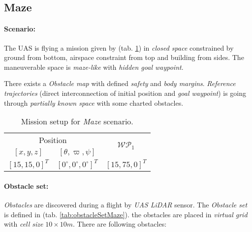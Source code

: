 \subsection{Maze}\label{s:testMaze}

\paragraph{Scenario:} The UAS is flying a mission given by (tab. \ref{tab:missionSetupMazeScenario}) in \emph{closed space} constrained by ground from bottom, airspace constraint from top and building from sides. The maneuverable space is \emph{maze-like} with  \emph{hidden goal waypoint}.

There exists a \emph{Obstacle map} with defined \emph{safety} and \emph{body margins}. \emph{Reference trajectories} (direct interconnection of initial position and \emph{goal waypoint}) is going through \emph{partially known space} with some charted obstacles.

\begin{table}[H]
    \centering
    \begin{tabular}{c|c||c}
        \multicolumn{2}{c||}{Position} & \multirow{2}{*}{$\mathscr{WP}_1$} \\\cline{1-2}
        $[x,y,z]$           & $[\theta,\varpi,\psi]$           & \\\hline\hline
        $[15,15,0]^T $        & $[0^\circ,0^\circ,0^\circ]^T$    & $[15,75,0]^T$        \\ 
    \end{tabular}
    \caption{Mission setup for \emph{Maze} scenario.}
    \label{tab:missionSetupMazeScenario}
\end{table}

\paragraph{Obstacle set:} \emph{Obstacles} are discovered during a flight by \emph{UAS LiDAR} sensor. The \emph{Obstacle set} is defined in (tab. \ref{tab:obstacleSetMaze}). the obstacles are placed in \emph{virtual grid} with \emph{cell size} $10 \times 10 m$. There are following obstacles:

